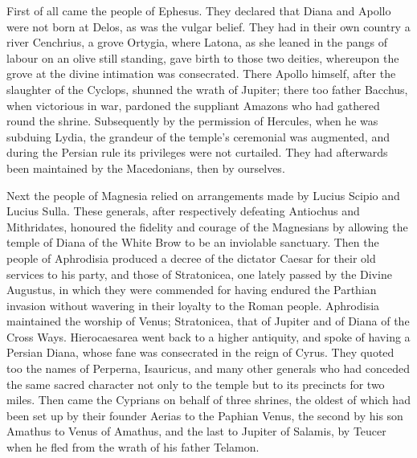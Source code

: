 First of all came the people of Ephesus. They declared that Diana and Apollo were not born at Delos, as was the vulgar belief. They had in their own country a river Cenchrius, a grove Ortygia, where Latona, as she leaned in the pangs of labour on an olive still standing, gave birth to those two deities, whereupon the grove at the divine intimation was consecrated. There Apollo himself, after the slaughter of the Cyclops, shunned the wrath of Jupiter; there too father Bacchus, when victorious in war, pardoned the suppliant Amazons who had gathered round the shrine. Subsequently by the permission of Hercules, when he was subduing Lydia, the grandeur of the temple's ceremonial was augmented, and during the Persian rule its privileges were not curtailed. They had afterwards been maintained by the Macedonians, then by ourselves.


Next the people of Magnesia relied on arrangements made by Lucius Scipio and Lucius Sulla. These generals, after respectively defeating Antiochus and Mithridates, honoured the fidelity and courage of the Magnesians by allowing the temple of Diana of the White Brow to be an inviolable sanctuary. Then the people of Aphrodisia produced a decree of the dictator Caesar for their old services to his party, and those of Stratonicea, one lately passed by the Divine Augustus, in which they were commended for having endured the Parthian invasion without wavering in their loyalty to the Roman people. Aphrodisia maintained the worship of Venus; Stratonicea, that of Jupiter and of Diana of the Cross Ways. Hierocaesarea went back to a higher antiquity, and spoke of having a Persian Diana, whose fane was consecrated in the reign of Cyrus. They quoted too the names of Perperna, Isauricus, and many other generals who had conceded the same sacred character not only to the temple but to its precincts for two miles. Then came the Cyprians on behalf of three shrines, the oldest of which had been set up by their founder Aerias to the Paphian Venus, the second by his son Amathus to Venus of Amathus, and the last to Jupiter of Salamis, by Teucer when he fled from the wrath of his father Telamon.


